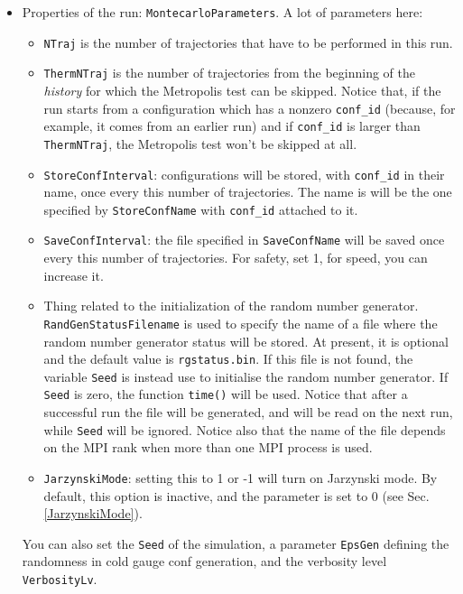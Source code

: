 \begin{itemize}
\item{Properties of the run: \verb|MontecarloParameters|.} A lot of parameters here: 
\begin{itemize}
\item \verb|NTraj| is the number of trajectories that have to be performed in this run.
\item \verb|ThermNTraj| is the number of trajectories from the beginning of the 
\emph{history} for which the Metropolis test can be skipped. Notice that, if the 
run starts from a configuration which has a nonzero \verb|conf_id| (because,
for example, it comes from an earlier run) and if \verb|conf_id| is larger than 
\verb|ThermNTraj|, the Metropolis test won't be skipped at all.
\item \verb|StoreConfInterval|: configurations will be stored, with 
\verb|conf_id| in their name, once every this number of trajectories. The name is will
be the one specified by \verb|StoreConfName| with \verb|conf_id| attached to it. 
\item \verb|SaveConfInterval|: the file specified in \verb|SaveConfName| will be saved once every this number of trajectories. For safety, set 1, for speed, you can increase it.

\item Thing related to the initialization of the random number generator. \verb|RandGenStatusFilename| is 
used to specify the name of a file where the random number generator status 
will be stored. At present, it is optional and the default value is 
\verb|rgstatus.bin|. If this file is not found, the variable \verb|Seed| is 
instead use to initialise the random number generator. If \verb|Seed| is zero, 
the function \verb|time()| will be used. Notice that after a successful run 
the file will be generated, and will be read on the next run, while \verb|Seed| 
will be ignored. Notice also that the name of the file depends on the MPI rank when more than one MPI 
process is used.
\item \verb|JarzynskiMode|: setting this to 1 or -1 will turn on Jarzynski 
mode. By default, this option is 
inactive, and the parameter is set to 0 (see Sec. \ref{JarzynskiMode}).
\end{itemize}
You can also set the \verb|Seed| of the simulation, a parameter 
\verb|EpsGen| defining the randomness in cold gauge conf generation, and the 
verbosity level \verb|VerbosityLv|.




\end{itemize}
